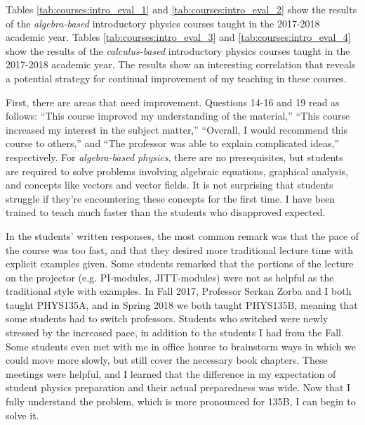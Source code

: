 \documentclass[../../main.tex]{subfiles}
\begin{document}
Tables \ref{tab:courses:intro_eval_1} and \ref{tab:courses:intro_eval_2} show the results of the \textit{algebra-based} introductory physics courses taught in the 2017-2018 academic year.  Tables \ref{tab:courses:intro_eval_3} and \ref{tab:courses:intro_eval_4} show the results of the \textit{calculus-based} introductory physics courses taught in the 2017-2018 academic year.  The results show an interesting correlation that reveals a potential strategy for continual improvement of my teaching in these courses. \\ \hspace{0.1cm}

First, there are areas that need improvement.  Questions 14-16 and 19 read as follows: ``This course improved my understanding of the material,'' ``This course increased my interest in the subject matter,'' ``Overall, I would recommend this course to others,'' and ``The professor was able to explain complicated ideas,'' respectively.  For \textit{algebra-based physics}, there are no prerequisites, but students are required to solve problems involving algebraic equations, graphical analysis, and concepts like vectors and vector fields.  It is not surprising that students struggle if they're encountering these concepts for the first time.  I have been trained to teach much faster than the students who disapproved expected.  \\ \hspace{0.1cm}

In the students' written responses, the most common remark was that the pace of the course was too fast, and that they desired more traditional lecture time with explicit examples given.  Some students remarked that the portions of the lecture on the projector (e.g. PI-modules, JITT-modules) were not as helpful as the traditional style with examples.  In Fall 2017, Professor Serkan Zorba and I both taught PHYS135A, and in Spring 2018 we both taught PHYS135B, meaning that some students had to switch professors.  Students who switched were newly stressed by the increased pace, in addition to the students I had from the Fall.  Some students even met with me in office hourse to brainstorm ways in which we could move more slowly, but still cover the necessary book chapters.  These meetings were helpful, and I learned that the difference in my expectation of student physics preparation and their actual preparedness was wide.  Now that I fully understand the problem, which is more pronounced for 135B, I can begin to solve it.  \\ \hspace{0.1cm}
\end{document}
